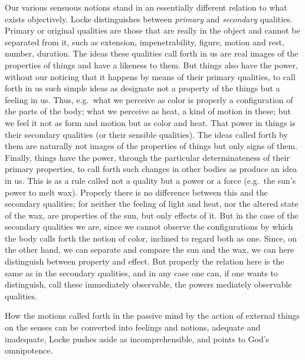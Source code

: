 Our various sensuous notions stand in an essentially different
relation to what exists objectively. Locke distinguishes between
\emph{primary} and \emph{secondary} qualities. Primary or original
qualities are those that are really in the object and cannot be
separated from it, such as extension, impenetrability, figure, motion
and rest, number, duration. The ideas these qualities call forth in us
are real images of the properties of things and have a likeness to
them. But things also have the power, without our noticing that it
happens by means of their primary qualities, to call forth in us such
simple ideas as designate not a property of the things but a feeling in
us. Thus, e.g.\ what we perceive as color is properly a configuration
of the parts of the body; what we perceive as heat, a kind of motion in
these; but we feel it not as form and motion but as color and heat.
That power in things is their secondary qualities (or their sensible
qualities). The ideas called forth by them are naturally not images of
the properties of things but only signs of them. Finally, things have
the power, through the particular determinateness of their primary
properties, to call forth such changes in other bodies as produce an
idea in us. This is as a rule called not a quality but a power or a
force (e.g.\ the sun's power to melt wax). Properly there is no
difference between this and the secondary qualities; for neither the
feeling of light and heat, nor the altered state of the wax, are
properties of the sun, but only effects of it. But in the case of the
secondary qualities we are, since we cannot observe the configurations
by which the body calls forth the notion of color, inclined to regard
both as one. Since, on the other hand, we can separate and compare the
sun and the wax, we can here distinguish between property and
effect. But properly the relation here is the same as in the secondary
qualities, and in any case one can, if one wants to distinguish, call
these immediately observable, the powers mediately observable
qualities.

How the motions called forth in the passive mind by the action of
external things on the senses can be converted into feelings and
notions, adequate and inadequate, Locke pushes aside as
incomprehensible, and points to God's omnipotence.

